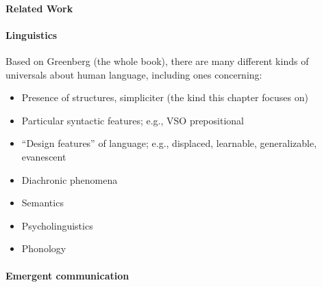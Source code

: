 \paragraph{Related Work}


\paragraph{Linguistics}

Based on Greenberg (the whole book), there are many different kinds of universals about human language, including ones concerning:
\begin{itemize}[nosep]
  \item Presence of structures, simpliciter (the kind this chapter focuses on)
  \item Particular syntactic features; e.g., VSO \textrightarrow{} prepositional
  \item ``Design features'' of language; e.g., displaced, learnable, generalizable, evanescent
  \item Diachronic phenomena
  \item Semantics
  \item Psycholinguistics
  \item Phonology
\end{itemize}



\paragraph{Emergent communication}




